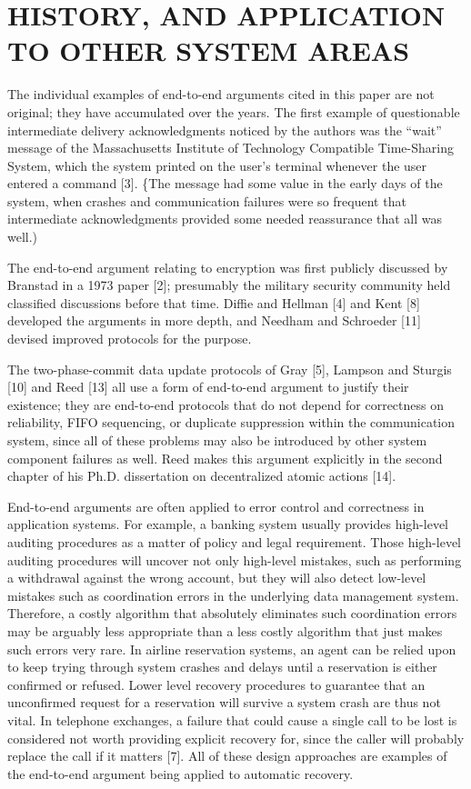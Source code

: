 \documentclass[a4paper,11pt,notitlepage,twoside,openright]{article}
\begin{document}
\hypertarget{history-and-application-to-other-system-areas}{%
\section{HISTORY, AND APPLICATION TO OTHER SYSTEM
AREAS}\label{history-and-application-to-other-system-areas}}


The individual examples of end-to-end arguments cited in this paper are
not original; they have accumulated over the years. The first example of
questionable intermediate delivery acknowledgments noticed by the
authors was the ``wait'' message of the Massachusetts Institute of
Technology Compatible Time-Sharing System, which the system printed on
the user's terminal whenever the user entered a command {[}3{]}. \{The
message had some value in the early days of the system, when crashes and
communication failures were so frequent that intermediate
acknowledgments provided some needed reassurance that all was well.)


The end-to-end argument relating to encryption was first publicly
discussed by Branstad in a 1973 paper {[}2{]}; presumably the military
security community held classified discussions before that time. Diffie
and Hellman {[}4{]} and Kent {[}8{]} developed the arguments in more
depth, and Needham and Schroeder {[}11{]} devised improved protocols for
the purpose.


The two-phase-commit data update protocols of Gray {[}5{]}, Lampson and
Sturgis {[}10{]} and Reed {[}13{]} all use a form of end-to-end argument to justify
their existence; they are end-to-end protocols that do not depend for
correctness on reliability, FIFO sequencing, or duplicate suppression
within the communication system, since all of these problems may also
be introduced by other system component failures as well. Reed makes
this argument explicitly in the second chapter of his Ph.D.
dissertation on decentralized atomic actions {[}14{]}.

End-to-end arguments are often applied to error control and correctness
in application systems. For example, a banking system usually provides
high-level auditing procedures as a matter of policy and legal
requirement. Those high-level auditing procedures will uncover not only
high-level mistakes, such as performing a withdrawal against the wrong
account, but they will also detect low-level mistakes such as
coordination errors in the underlying data management system. Therefore,
a costly algorithm that absolutely eliminates such coordination errors
may be arguably less appropriate than a less costly algorithm that just
makes such errors very rare. In airline reservation systems, an agent
can be relied upon to keep trying through system crashes and delays
until a reservation is either confirmed or refused. Lower level recovery
procedures to guarantee that an unconfirmed request for a reservation
will survive a system crash are thus not vital. In telephone exchanges,
a failure that could cause a single call to be lost is considered not
worth providing explicit recovery for, since the caller will probably
replace the call if it matters {[}7{]}. All of these design approaches
are examples of the end-to-end argument being applied to automatic
recovery.
\end{document}
